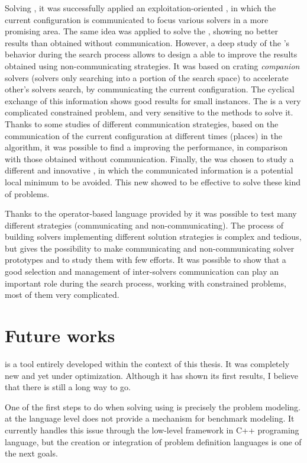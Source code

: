 Solving \sgp{}, it was successfully applied an exploitation-oriented \commstr, in which the current configuration is communicated to focus various solvers in a more promising area. The same idea was applied to solve the \nqp{}, showing no better results than obtained without communication. However, a deep study of the \posl's behavior during the search process allows to design a \commstr{} able to improve the results obtained using non-communicating strategies. It was based on crating \textit{companion} solvers (solvers only searching into a portion of the search space) to accelerate other's solvers search, by communicating the current configuration. The cyclical exchange of this information shows good results for small instances. The \carrp{} is a very complicated constrained problem, and very sensitive to the methods to solve it. Thanks to some studies of different communication strategies, based on the communication of the current configuration at different times (places) in the algorithm, it was possible to find a \commstr{} improving the performance, in comparison with those obtained without communication. Finally, the \grp{} was chosen to study a different and innovative \commstr, in which the communicated information is a potential local minimum to be avoided. This new \commstr{} showed to be effective to solve these kind of problems.

Thanks to the operator-based language provided by \posl{} it was possible to test many different strategies (communicating and non-communicating). The process of building solvers implementing different solution strategies is complex and tedious, but \posl{} gives the possibility to make communicating and non-communicating solver prototypes and to study them with few efforts. It was possible to show that a good selection and management of inter-solvers communication can play an important role during the search process, working with constrained problems, most of them very complicated.

\section{Future works}

\posl{} is a tool entirely developed within the context of this thesis. It was completely new and yet under optimization. Although it has shown its first results, I believe that there is still a long way to go. 

One of the first steps to do when solving \CSPs using \posl{} is precisely the problem modeling. \posl{} at the language level does not provide a mechanism for benchmark modeling. It currently handles this issue through the low-level framework in C++ programing language, but the creation or integration of problem definition languages is one of the next goals.

